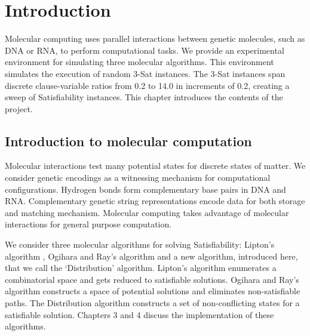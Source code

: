 \chapter{Introduction}


Molecular computing uses parallel interactions between genetic molecules, such as DNA or RNA, to perform computational tasks.  We provide an experimental environment for simulating three molecular algorithms.  This environment simulates the execution of random $3$-{\sc Sat} instances.  The $3$-{\sc Sat} instances span discrete clause-variable ratios from 0.2 to 14.0 in increments of 0.2, creating a sweep of {\sc Satisfiability} instances.  This chapter introduces the contents of the project.

\section{Introduction to molecular computation}
	
				
Molecular interactions test many potential states for discrete states of matter.  We consider genetic encodings as a witnessing mechanism for computational configurations.  Hydrogen bonds form complementary base pairs in DNA and RNA.  Complementary genetic string representations encode data for both storage and matching mechanism.  Molecular computing takes advantage of molecular interactions for general purpose computation.

	We consider three molecular algorithms for solving {\sc Satisfiability}: Lipton's algorithm \cite{Lipton95usingdna}, Ogihara and Ray's algorithm \cite{Ogihara:1996:BFS:898228, Ogihara97dna-basedparallel} and a new algorithm, introduced here, that we call the `Distribution' algorithm.  Lipton's algorithm enumerates a combinatorial space and gets reduced to satisfiable solutions.  Ogihara and Ray's algorithm constructs a space of potential solutions and eliminates non-satisfiable paths.  The Distribution algorithm constructs a set of non-conflicting states for a satisfiable solution.  Chapters 3 and 4 discuss the implementation of these algorithms.
				
